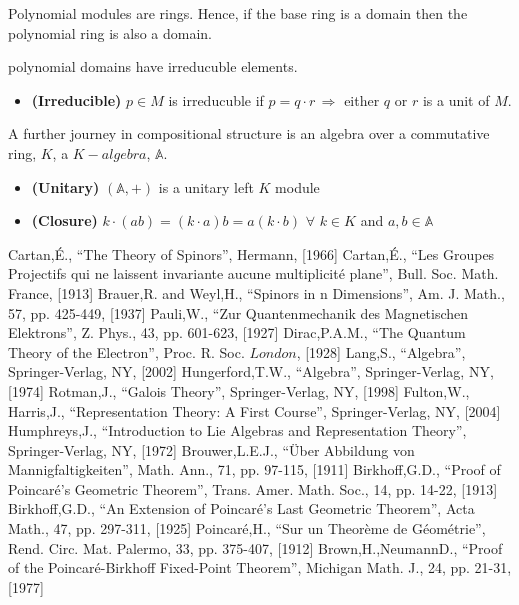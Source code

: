 \documentclass[aps,twocolumn,secnumarabic,nobalancelastpage,amsmath,amssymb,
nofootinbib,parskip=full]{revtex4}
\begin{document}
Polynomial modules are rings. Hence, if the base ring is a domain
then the polynomial ring is also a domain.

polynomial domains have irreducuble elements.

\begin{itemize}
\item \textbf{\small (Irreducible)} $p\in M$ is irreducuble
  if $p=q\cdot r\,\Rightarrow$ either $q$ or $r$ is a unit of $M$.
\end{itemize}

A further journey in compositional structure is an algebra over a
commutative ring, $K$, a $K-algebra$, $\mathbb{A}$.

\begin{itemize}
\item \textbf{\small (Unitary)} $(\mathbb{A},+)$ is a unitary left $K$ module
\item \textbf{\small (Closure)} $k\cdot(ab)=(k\cdot a)b=a(k\cdot b)$
  $\forall$ $k\in K$ and $a,b\in\mathbb{A}$
\end{itemize}






\begin{thebibliography}{99}
Cartan,\'{E}., ``The Theory of Spinors'', Hermann, [1966]
Cartan,\'{E}., ``Les Groupes Projectifs qui ne laissent
  invariante aucune multiplicit\'{e} plane'', Bull. Soc. Math. France, [1913]
Brauer,R. and Weyl,H., ``Spinors in n Dimensions'', Am. J. Math., 57, pp. 425-449, [1937]
Pauli,W., ``Zur Quantenmechanik des Magnetischen Elektrons'', Z. Phys., 43, pp. 601-623, [1927]
Dirac,P.A.M., ``The Quantum Theory of the Electron'', Proc. R. Soc. \(London\), [1928]
Lang,S., ``Algebra'', Springer-Verlag, NY, [2002]
Hungerford,T.W., ``Algebra'', Springer-Verlag, NY, [1974]
Rotman,J., ``Galois Theory'', Springer-Verlag, NY, [1998]
Fulton,W., Harris,J., ``Representation Theory: A First Course'', Springer-Verlag, NY, [2004]
Humphreys,J., ``Introduction to Lie Algebras and Representation Theory'', Springer-Verlag, NY, [1972]
Brouwer,L.E.J., ``\"Uber Abbildung von Mannigfaltigkeiten'', Math. Ann., 71, pp. 97-115, [1911]
Birkhoff,G.D., ``Proof of Poincar\'e's Geometric Theorem'', Trans. Amer. Math. Soc., 14, pp. 14-22, [1913]
Birkhoff,G.D., ``An Extension of Poincar\'e's Last Geometric Theorem'', Acta Math., 47, pp. 297-311, [1925]
Poincar\'e,H., ``Sur un Theor\`eme de G\'eom\'etrie'', Rend. Circ. Mat. Palermo, 33, pp. 375-407, [1912]
Brown,H.,NeumannD., ``Proof of the Poincar\'e-Birkhoff Fixed-Point Theorem'', Michigan Math. J., 24, pp. 21-31, [1977]

\end{thebibliography}
\end{document}
